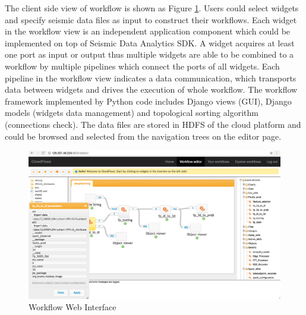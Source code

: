 The client side view of workflow is shown as Figure \ref{workflow}. Users could select widgets and specify seismic data files as input to construct their workflows. Each widget in the workflow view is an independent application component which could be implemented on top of Seismic Data Analytics SDK. A widget acquires at least one port as input or output thus multiple widgets are able to be combined to a workflow by multiple pipelines which connect the ports of all widgets. Each pipeline in the workflow view indicates a data communication, which transports data between widgets and drives the execution of whole workflow. The workflow framework implemented by Python code includes Django views (GUI), Django models (widgets data management) and topological sorting algorithm (connections check).  The data files are stored in HDFS of the cloud platform and could be browsed and selected from the navigation trees on the editor page.

\begin{figure}[h]
\centering
\includegraphics[scale=0.3]{figures/workflow.png}
\caption{Workflow Web Interface}
\label{workflow}
\end{figure}

